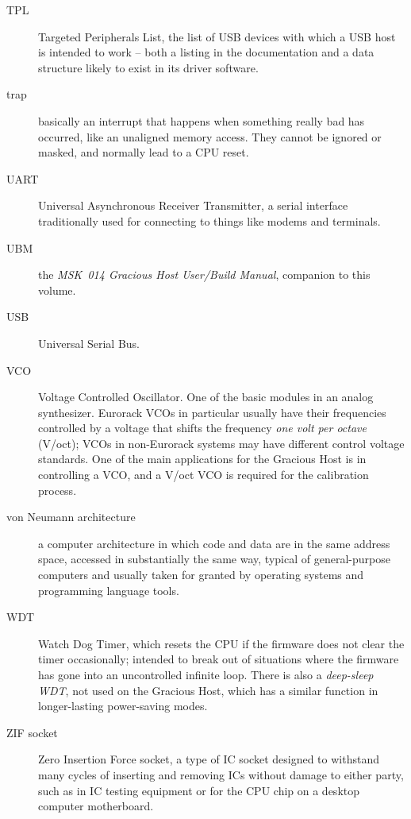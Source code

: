 \begin{description}
\item[TPL] Targeted Peripherals List, the list of USB devices with which a
USB host is intended to work -- both a listing in the documentation and a
data structure likely to exist in its driver software.

\item[trap] basically an interrupt that happens when something really bad
has occurred, like an unaligned memory access.  They cannot be ignored or
masked, and normally lead to a CPU reset.

\item[UART] Universal Asynchronous Receiver Transmitter, a serial interface
traditionally used for connecting to things like modems and terminals.

\item[UBM] the \emph{MSK~014 Gracious Host User/Build Manual}, companion to
this volume.

\item[USB] Universal Serial Bus.

\item[VCO] Voltage Controlled Oscillator.  One of the basic modules in an
analog synthesizer.  Eurorack VCOs in particular usually have their
frequencies controlled by a voltage that shifts the frequency \emph{one volt
per octave} (V/oct); VCOs in non-Eurorack systems may have different control
voltage standards.  One of the main applications for the Gracious Host is in
controlling a VCO, and a V/oct VCO is required for the calibration process.

\item[von Neumann architecture] a computer architecture in which code and
data are in the same address space, accessed in substantially the same way,
typical of general-purpose computers and usually taken for granted by
operating systems and programming language tools.

\item[WDT] Watch Dog Timer, which resets the CPU if the firmware does not
clear the timer occasionally; intended to break out of situations where the
firmware has gone into an uncontrolled infinite loop.  There is also a
\emph{deep-sleep WDT}, not used on the Gracious Host, which has a similar
function in longer-lasting power-saving modes.

\item[ZIF socket] Zero Insertion Force socket, a type of IC socket designed
to withstand many cycles of inserting and removing ICs without damage to
either party, such as in IC testing equipment or for the CPU chip on
a desktop computer motherboard.

\end{description}
